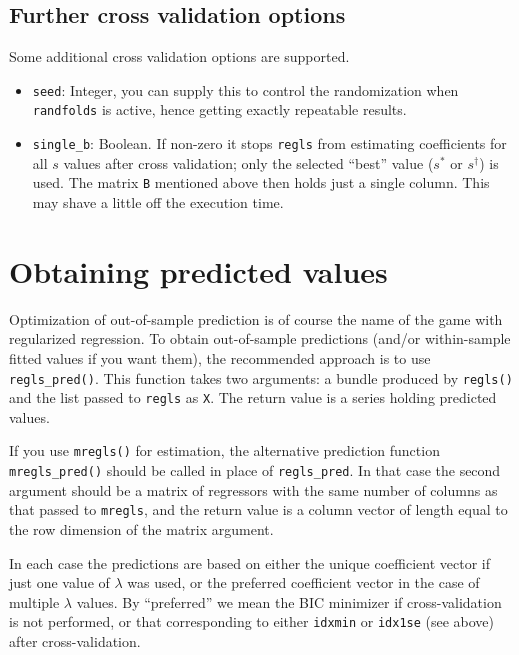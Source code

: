 \documentclass{article}
\begin{document}
\subsection*{Further cross validation options}

Some additional cross validation options are supported.

\begin{itemize}
\item \texttt{seed}: Integer, you can supply this to control the
  randomization when \texttt{randfolds} is active, hence getting
  exactly repeatable results.
\item \texttt{single\_b}: Boolean. If non-zero it stops \texttt{regls}
  from estimating coefficients for all $s$ values after cross
  validation; only the selected ``best'' value ($s^*$ or
  $s^{\dagger}$) is used. The matrix \texttt{B} mentioned above
  then holds just a single column. This may shave a little off the
  execution time.
\end{itemize}

\section{Obtaining predicted values}
\label{sec:predict}

Optimization of out-of-sample prediction is of course the name of the
game with regularized regression. To obtain out-of-sample predictions
(and/or within-sample fitted values if you want them), the recommended
approach is to use \texttt{regls\_pred()}. This function takes two
arguments: a bundle produced by \texttt{regls()} and the list passed
to \texttt{regls} as \texttt{X}. The return value is a series holding
predicted values.

If you use \texttt{mregls()} for estimation, the alternative
prediction function \texttt{mregls\_pred()} should be called in place
of \texttt{regls\_pred}. In that case the second argument should be a
matrix of regressors with the same number of columns as that passed to
\texttt{mregls}, and the return value is a column vector of length
equal to the row dimension of the matrix argument.

In each case the predictions are based on either the unique
coefficient vector if just one value of $\lambda$ was used, or the
preferred coefficient vector in the case of multiple $\lambda$
values. By ``preferred'' we mean the BIC minimizer if cross-validation
is not performed, or that corresponding to either \texttt{idxmin} or
\texttt{idx1se} (see above) after cross-validation.
\end{document}
